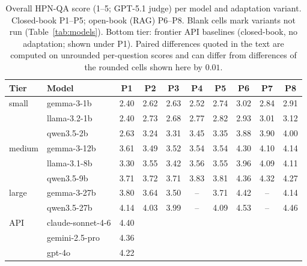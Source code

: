 \begin{table}[t]\centering\footnotesize
\caption{Overall HPN-QA score (1--5; GPT-5.1 judge) per model and adaptation variant. Closed-book P1--P5; open-book (RAG) P6--P8. Blank cells mark variants not run (Table~\ref{tab:models}). Bottom tier: frontier API baselines (closed-book, no adaptation; shown under P1). Paired differences quoted in the text are computed on unrounded per-question scores and can differ from differences of the rounded cells shown here by $0.01$.}
\label{tab:main}
\begin{tabular}{llcccccccc}
\toprule
Tier & Model & P1 & P2 & P3 & P4 & P5 & P6 & P7 & P8 \\ \midrule
small & gemma-3-1b & 2.40 & 2.62 & 2.63 & 2.52 & 2.74 & 3.02 & 2.84 & 2.91 \\
 & llama-3.2-1b & 2.40 & 2.73 & 2.68 & 2.77 & 2.82 & 2.93 & 3.01 & 3.12 \\
 & qwen3.5-2b & 2.63 & 3.24 & 3.31 & 3.45 & 3.35 & 3.88 & 3.90 & 4.00 \\
medium & gemma-3-12b & 3.61 & 3.49 & 3.52 & 3.54 & 3.54 & 4.30 & 4.10 & 4.14 \\
 & llama-3.1-8b & 3.30 & 3.55 & 3.42 & 3.56 & 3.55 & 3.96 & 4.09 & 4.11 \\
 & qwen3.5-9b & 3.71 & 3.72 & 3.71 & 3.83 & 3.81 & 4.36 & 4.32 & 4.27 \\
large & gemma-3-27b & 3.80 & 3.64 & 3.50 & -- & 3.71 & 4.42 & -- & 4.14 \\
 & qwen3.5-27b & 4.14 & 4.03 & 3.99 & -- & 4.09 & 4.53 & -- & 4.46 \\
\midrule
API & claude-sonnet-4-6 & 4.40 &  &  &  &  &  &  &  \\
 & gemini-2.5-pro & 4.36 &  &  &  &  &  &  &  \\
 & gpt-4o & 4.22 &  &  &  &  &  &  &  \\
\bottomrule
\end{tabular}
\end{table}
